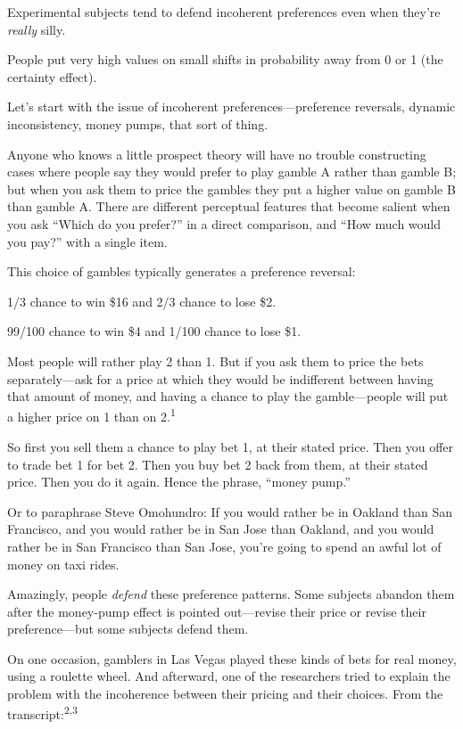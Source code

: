 {
 Experimental subjects tend to defend incoherent preferences even
when they're \textit{really} silly.}

{
 People put very high values on small shifts in probability away
from 0 or 1 (the certainty effect).}

{
 Let's start with the issue of incoherent
preferences---preference reversals, dynamic inconsistency, money pumps,
that sort of thing.}

{
 Anyone who knows a little prospect theory will have no trouble
constructing cases where people say they would prefer to play gamble A
rather than gamble B; but when you ask them to price the gambles they
put a higher value on gamble B than gamble A. There are different
perceptual features that become salient when you ask
``Which do you prefer?'' in a direct
comparison, and ``How much would you
pay?'' with a single item.}

{
 This choice of gambles typically generates a preference reversal:}

{
 1/3 chance to win \$16 and 2/3 chance to lose \$2.}

{
 99/100 chance to win \$4 and 1/100 chance to lose \$1.}

{
 Most people will rather play 2 than 1. But if you ask them to
price the bets separately---ask for a price at which they would be
indifferent between having that amount of money, and having a chance to
play the gamble---people will put a higher price on 1 than on
2.\textsuperscript{1}}

{
 So first you sell them a chance to play bet 1, at their stated
price. Then you offer to trade bet 1 for bet 2. Then you buy bet 2 back
from them, at their stated price. Then you do it again. Hence the
phrase, ``money pump.''}

{
 Or to paraphrase Steve Omohundro: If you would rather be in
Oakland than San Francisco, and you would rather be in San Jose than
Oakland, and you would rather be in San Francisco than San Jose,
you're going to spend an awful lot of money on taxi
rides.}

{
 Amazingly, people \textit{defend} these preference patterns. Some
subjects abandon them after the money-pump effect is pointed
out---revise their price or revise their preference---but some subjects
defend them.}

{
 On one occasion, gamblers in Las Vegas played these kinds of bets
for real money, using a roulette wheel. And afterward, one of the
researchers tried to explain the problem with the incoherence between
their pricing and their choices. From the
transcript:\textsuperscript{2,3}}

